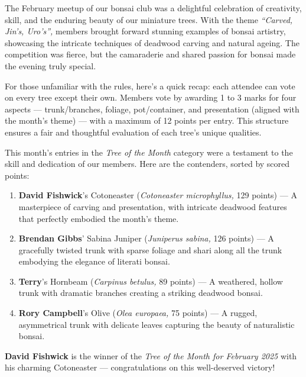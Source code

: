 \label{2025-02-contest}
\noindent
The February meetup of our bonsai club was a delightful celebration of creativity, skill, and the enduring beauty of our miniature trees. 
With the theme \textit{``Carved, Jin's, Uro's'',} members brought forward stunning examples of bonsai artistry, showcasing the intricate techniques of deadwood carving and natural ageing. 
The competition was fierce, but the camaraderie and shared passion for bonsai made the evening truly special.

For those unfamiliar with the rules, here's a quick recap: each attendee can vote on every tree except their own.
Members vote by awarding 1 to 3 marks for four aspects --- trunk/branches, foliage, pot/container, and presentation (aligned with the month's theme) --- with a maximum of 12 points per entry.
This structure ensures a fair and thoughtful evaluation of each tree's unique qualities.

\noindent 
This month's entries in the \textit{Tree of the Month} category were a testament to the skill and dedication of our members.
Here are the contenders, sorted by scored points:

\begin{enumerate}
    \item \textbf{David Fishwick}'s Cotoneaster (\textit{Cotoneaster microphyllus,} 129 points) --- A masterpiece of carving and presentation, with intricate deadwood features that perfectly embodied the month's theme.
    
    \item \textbf{Brendan Gibbs}' Sabina Juniper (\textit{Juniperus sabina,} 126 points) --- A gracefully twisted trunk with sparse foliage and shari along all the trunk embodying the elegance of literati bonsai.

    \item \textbf{Terry}'s Hornbeam (\textit{Carpinus betulus,} 89 points) ---  A weathered, hollow trunk with dramatic branches creating a striking deadwood bonsai.

    \item \textbf{Rory Campbell}'s Olive (\textit{Olea europaea,} 75 points) --- A rugged, asymmetrical trunk with delicate leaves capturing the beauty of naturalistic bonsai.
\end{enumerate}

\noindent 
\textbf{David Fishwick} is the winner of the \textit{Tree of the Month for February 2025} with his charming Cotoneaster --- congratulations on this well\--deserved victory!

